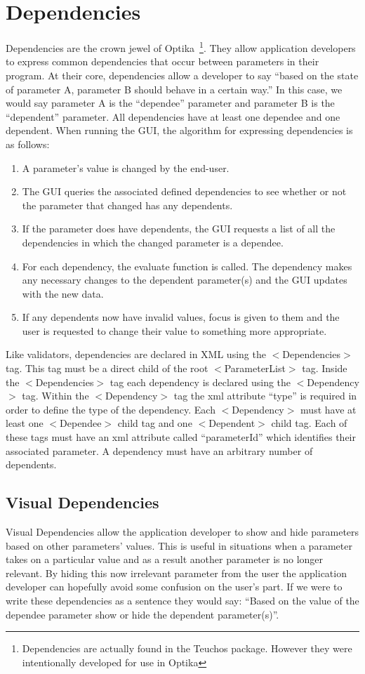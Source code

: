 \section{Dependencies}
Dependencies are the crown jewel of Optika~\footnote{Dependencies are actually found in the Teuchos package. However they were intentionally developed for use in Optika}.
They allow application developers to express common dependencies that occur between
parameters in their program. At their core, dependencies allow a developer to say ``based on the state of parameter A, parameter B should
behave in a certain way.'' In this case, we would say parameter A is the ``dependee'' parameter and parameter B is the ``dependent'' parameter.
All dependencies have at least one dependee and one dependent. When running the GUI, the algorithm for expressing dependencies is as follows:
\begin{enumerate}
	\item A parameter's value is changed by the end-user.
	\item The GUI queries the associated defined dependencies to see whether or not the parameter that changed has any dependents.
	\item If the parameter does have dependents, the GUI requests a list of all the dependencies in which the changed
	parameter is a dependee.
	\item For each dependency, the evaluate function is called. The dependency makes any necessary changes to the dependent parameter(s)
	and the GUI updates with the new data.
	\item If any dependents now have invalid values, focus is given to them and the user is requested to change their value to
	something more appropriate.
\end{enumerate}

Like validators, dependencies are declared in XML using the $<$Dependencies$>$ tag. This tag must be a direct child
of the root $<$ParameterList$>$ tag. Inside the $<$Dependencies$>$ tag each dependency is declared using the $<$Dependency$>$ tag. Within the
$<$Dependency$>$ tag the xml attribute ``type'' is required in order to define the type of the dependency. Each $<$Dependency$>$ must have at least
one $<$Dependee$>$ child tag and one $<$Dependent$>$ child tag. Each of these tags must have an xml attribute called ``parameterId'' which identifies
their associated parameter. A dependency must have an arbitrary number of dependents.

\subsection{Visual Dependencies}
Visual Dependencies allow the application developer to show and hide parameters based on other parameters' values. This is useful in situations
when a parameter takes on a particular value and as a result another parameter is no longer relevant. By hiding this now irrelevant parameter from the user the
application developer can hopefully avoid some confusion on the user's part. If we were to write these dependencies as a sentence they would say: ``Based on
the value of the dependee parameter show or hide the dependent parameter(s)''.

